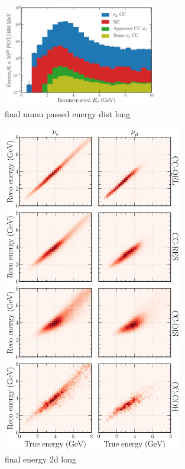 \begin{figure} %
    \includegraphics[width=0.6\textwidth]{diagrams/6-cvn/chipsnet/final_numu_passed_energy_dist.pdf}
    \caption[final numu passed energy dist short]
    {final numu passed energy dist long}
    \label{fig:final_numu_passed_energy_dist}
\end{figure}

\begin{figure} %
    \includegraphics[width=0.7\textwidth]{diagrams/6-cvn/chipsnet/final_energy_2d.pdf}
    \caption[final energy 2d short]
    {final energy 2d long}
    \label{fig:final_energy_2d}
\end{figure}

